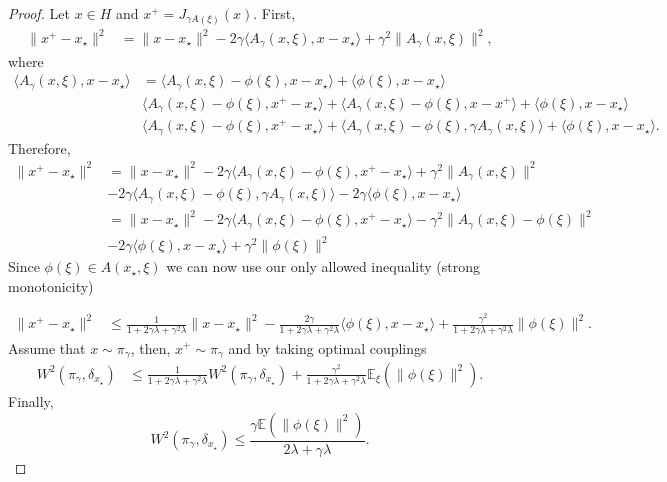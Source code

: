 \documentclass{article}
\newcommand{\1}{\mathbbm 1}
\newcommand{\bE}{{{\mathbb E}}}
\newcommand{\ps}[1]{\langle #1 \rangle}
\theoremstyle{definition}
\begin{document}
\begin{proof}
    Let $x \in H$ and $x^+ = J_{\gamma A(\xi)}(x)$. First,
    \begin{align*}
        \|x^+ - x_\star\|^2 &= \|x-x_\star\|^2 - 2\gamma\ps{A_\gamma(x,\xi),x-x_\star} + \gamma^2\|A_\gamma(x,\xi)\|^2,
    \end{align*}
    where
    \begin{align*}
        \ps{A_\gamma(x,\xi),x-x_\star} &= \ps{A_\gamma(x,\xi)-\phi(\xi),x-x_\star} + \ps{\phi(\xi),x-x_\star}\\
        &\ps{A_\gamma(x,\xi)-\phi(\xi),x^+ - x_\star} + \ps{A_\gamma(x,\xi)-\phi(\xi),x - x^+} + \ps{\phi(\xi),x-x_\star}\\
        &\ps{A_\gamma(x,\xi)-\phi(\xi),x^+ - x_\star} + \ps{A_\gamma(x,\xi)-\phi(\xi),\gamma A_\gamma(x,\xi)} + \ps{\phi(\xi),x-x_\star}.
    \end{align*}
    Therefore,
    \begin{align*}
        \|x^+ - x_\star\|^2 &= \|x-x_\star\|^2 - 2\gamma\ps{A_\gamma(x,\xi) - \phi(\xi),x^+-x_\star} + \gamma^2\|A_\gamma(x,\xi)\|^2\\
        &-2\gamma\ps{A_\gamma(x,\xi)-\phi(\xi),\gamma A_\gamma(x,\xi)} - 2\gamma \ps{\phi(\xi),x-x_\star}\\
        &= \|x-x_\star\|^2 - 2\gamma\ps{A_\gamma(x,\xi) - \phi(\xi),x^+-x_\star} - \gamma^2\|A_\gamma(x,\xi) - \phi(\xi)\|^2\\
        &- 2\gamma \ps{\phi(\xi),x-x_\star} + \gamma^2\|\phi(\xi)\|^2
    \end{align*}
Since $\phi(\xi) \in A(x_\star,\xi)$ we can now use our only allowed inequality (strong monotonicity) 

\begin{align*}
    \|x^+ - x_\star\|^2 &\leq \frac{1}{1 + 2\gamma \lambda + \gamma^2\lambda}\|x-x_\star\|^2 - \frac{2\gamma}{1 + 2\gamma \lambda + \gamma^2\lambda} \ps{\phi(\xi),x-x_\star} + \frac{\gamma^2}{1 + 2\gamma \lambda + \gamma^2\lambda}\|\phi(\xi)\|^2.
\end{align*}
Assume that $x \sim \pi_\gamma$, then, $x^+ \sim \pi_\gamma$ and by taking optimal couplings
\begin{align*}
    W^2(\pi_\gamma,\delta_{x_\star}) &\leq \frac{1}{1 + 2\gamma \lambda + \gamma^2\lambda}W^2(\pi_\gamma,\delta_{x_\star}) + \frac{\gamma^2}{1 + 2\gamma \lambda + \gamma^2\lambda}\bE_\xi(\|\phi(\xi)\|^2).
\end{align*}
Finally,
\begin{equation}
    W^2(\pi_\gamma,\delta_{x_\star}) \leq \frac{\gamma \bE(\|\phi(\xi)\|^2)}{2\lambda + \gamma\lambda}.
\end{equation}


\end{proof}
\end{document}
